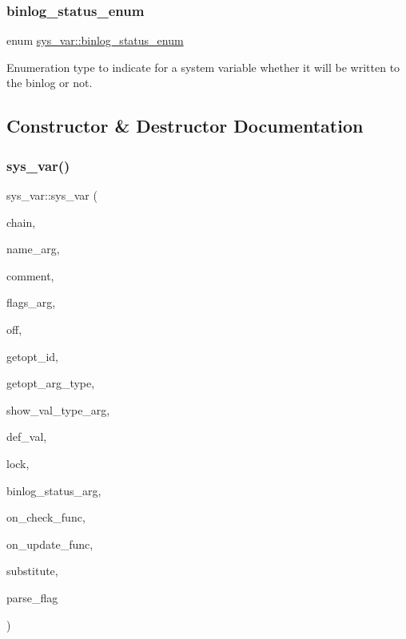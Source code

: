 \subsubsection{\texorpdfstring{binlog\+\_\+status\+\_\+enum}{binlog\_status\_enum}}
{\footnotesize\ttfamily enum \mbox{\hyperlink{classsys__var_a664520ec82191888717c86085bfa83ce}{sys\+\_\+var\+::binlog\+\_\+status\+\_\+enum}}}

Enumeration type to indicate for a system variable whether it will be written to the binlog or not. 

\subsection{Constructor \& Destructor Documentation}
\mbox{\label{classsys__var_a7a1f7993cd3dc1e34821408fce2c3062}} 
\subsubsection{\texorpdfstring{sys\+\_\+var()}{sys\_var()}}
{\footnotesize\ttfamily sys\+\_\+var\+::sys\+\_\+var (\begin{DoxyParamCaption}\item[{\mbox{\hyperlink{structsys__var__chain}{sys\+\_\+var\+\_\+chain}} $\ast$}]{chain,  }\item[{const char $\ast$}]{name\+\_\+arg,  }\item[{const char $\ast$}]{comment,  }\item[{int}]{flags\+\_\+arg,  }\item[{ptrdiff\+\_\+t}]{off,  }\item[{int}]{getopt\+\_\+id,  }\item[{enum get\+\_\+opt\+\_\+arg\+\_\+type}]{getopt\+\_\+arg\+\_\+type,  }\item[{S\+H\+O\+W\+\_\+\+T\+Y\+PE}]{show\+\_\+val\+\_\+type\+\_\+arg,  }\item[{longlong}]{def\+\_\+val,  }\item[{\mbox{\hyperlink{classPolyLock}{Poly\+Lock}} $\ast$}]{lock,  }\item[{enum \mbox{\hyperlink{classsys__var_a664520ec82191888717c86085bfa83ce}{binlog\+\_\+status\+\_\+enum}}}]{binlog\+\_\+status\+\_\+arg,  }\item[{on\+\_\+check\+\_\+function}]{on\+\_\+check\+\_\+func,  }\item[{on\+\_\+update\+\_\+function}]{on\+\_\+update\+\_\+func,  }\item[{const char $\ast$}]{substitute,  }\item[{int}]{parse\+\_\+flag }\end{DoxyParamCaption})}

